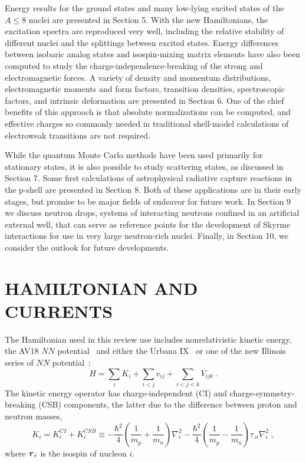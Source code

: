 Energy results for the ground states and many low-lying excited states of
the $A\leq8$ nuclei are presented in Section 5.
With the new Hamiltonians, the excitation spectra are reproduced very 
well, including the relative stability of different nuclei and the
splittings between excited states.
Energy differences between isobaric analog states and isospin-mixing matrix
elements have also been computed to study the charge-independence-breaking 
of the strong and electromagnetic forces.
A variety of density and momentum distributions, 
electromagnetic moments and form factors, transition densities, spectroscopic 
factors, and intrinsic deformation are presented in Section 6.
One of the chief benefits of this approach is that absolute normalizations
can be computed, and effective charges so commonly needed in traditional
shell-model calculations of electroweak transitions are not required.

While the quantum Monte Carlo methods have been used primarily for 
stationary states, it is also possible to study scattering states, as 
discussed in Section 7.
Some first calculations of astrophysical radiative capture reactions in the
p-shell are presented in Section 8.
Both of these applications are in their early stages, but promise to be
major fields of endeavor for future work.
In Section 9 we discuss neutron drops, systems of interacting neutrons 
confined in an artificial external well, that can serve as reference points 
for the development of Skyrme interactions for use in very large neutron-rich
nuclei.
Finally, in Section 10, we consider the outlook for future developments.

\section{HAMILTONIAN AND CURRENTS}

The Hamiltonian used in this review use includes nonrelativistic kinetic energy, 
the AV18 $N\!N$ potential~\cite{WSS95} and either the Urbana IX~\cite{PPCW95} 
or one of the new Illinois series of $N\!N\!$ potential~\cite{PPWC01}:
\begin{equation}
   H = \sum_{i} K_{i} + \sum_{i<j} v_{ij} + \sum_{i<j<k} V_{ijk} \ .
\label{eq:H}
\end{equation}
The kinetic energy operator has charge-independent (CI) and
charge-symmetry-breaking (CSB) components, the latter due to
the difference between proton and neutron masses,
\begin{equation}
   K_{i} = K^{CI}_{i} + K^{CSB}_{i} \equiv -\frac{\hbar^2}{4}
     (\frac{1}{m_{p}} + \frac{1}{m_{n}}) \nabla^{2}_{i}
    -\frac{\hbar^2}{4} (\frac{1}{m_{p}} - \frac{1}{m_{n}})\tau_{zi}
     \nabla^{2}_{i} ~,
\end{equation}
where $\mbox{\boldmath$\tau$}_{i}$ is the isospin of nucleon $i$.

